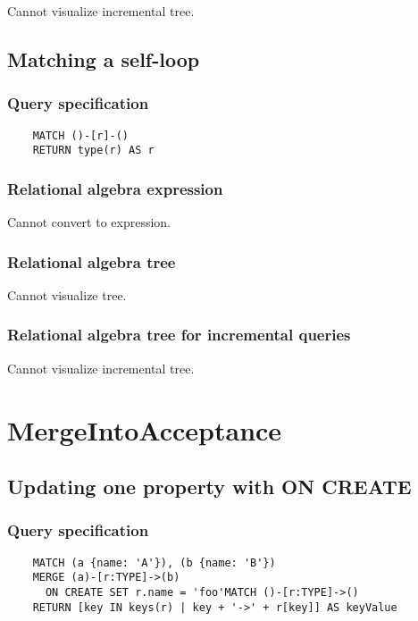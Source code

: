 	Cannot visualize incremental tree.
	\subsection{Matching a self-loop}

	\subsubsection*{Query specification}

	\begin{lstlisting}
	MATCH ()-[r]-()
	RETURN type(r) AS r
	\end{lstlisting}


	\subsubsection*{Relational algebra expression}

	Cannot convert to expression.

	\subsubsection*{Relational algebra tree}

	Cannot visualize tree.

	\subsubsection*{Relational algebra tree for incremental queries}

	Cannot visualize incremental tree.

	\section{MergeIntoAcceptance}

	\subsection{Updating one property with ON CREATE}

	\subsubsection*{Query specification}

	\begin{lstlisting}
	MATCH (a {name: 'A'}), (b {name: 'B'})
	MERGE (a)-[r:TYPE]->(b)
	  ON CREATE SET r.name = 'foo'MATCH ()-[r:TYPE]->()
	RETURN [key IN keys(r) | key + '->' + r[key]] AS keyValue
	\end{lstlisting}


